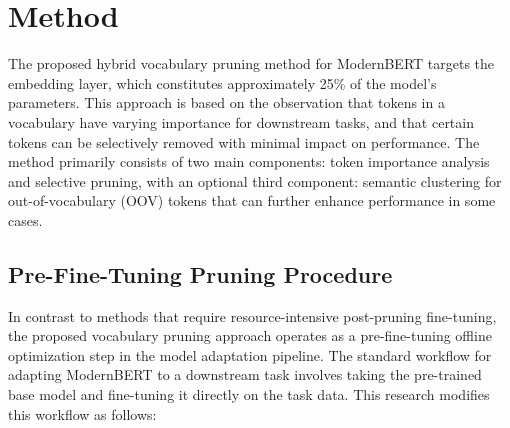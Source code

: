 \documentclass[twocolumn]{article}
\begin{document}
\section{Method}
The proposed hybrid vocabulary pruning method for ModernBERT targets the embedding layer, which constitutes approximately 25\% of the model's parameters. This approach is based on the observation that tokens in a vocabulary have varying importance for downstream tasks, and that certain tokens can be selectively removed with minimal impact on performance. The method primarily consists of two main components: token importance analysis and selective pruning, with an optional third component: semantic clustering for out-of-vocabulary (OOV) tokens that can further enhance performance in some cases.

\subsection{Pre-Fine-Tuning Pruning Procedure}
In contrast to methods that require resource-intensive post-pruning fine-tuning, the proposed vocabulary pruning approach operates as a pre-fine-tuning offline optimization step in the model adaptation pipeline. The standard workflow for adapting ModernBERT to a downstream task involves taking the pre-trained base model and fine-tuning it directly on the task data. This research modifies this workflow as follows:
\end{document}
